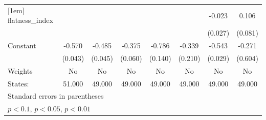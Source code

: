 {\begin{tabular}{l*{7}{c}}
[1em]
flatness\_index&                     &                     &                     &                     &                     &      -0.023         &       0.106         \\
            &                     &                     &                     &                     &                     &     (0.027)         &     (0.081)         \\
[1em]
Constant    &      -0.570\sym{***}&      -0.485\sym{***}&      -0.375\sym{***}&      -0.786\sym{***}&      -0.339         &      -0.543\sym{***}&      -0.271         \\
            &     (0.043)         &     (0.045)         &     (0.060)         &     (0.140)         &     (0.210)         &     (0.029)         &     (0.604)         \\
\hline
Weights     &          No         &          No         &          No         &          No         &          No         &          No         &          No         \\
States:     &      51.000         &      49.000         &      49.000         &      49.000         &      49.000         &      49.000         &      49.000         \\
\hline\hline
\multicolumn{8}{l}{\footnotesize Standard errors in parentheses}\\
\multicolumn{8}{l}{\footnotesize \sym{*} \(p<0.1\), \sym{**} \(p<0.05\), \sym{***} \(p<0.01\)}\\
\end{tabular}
}
